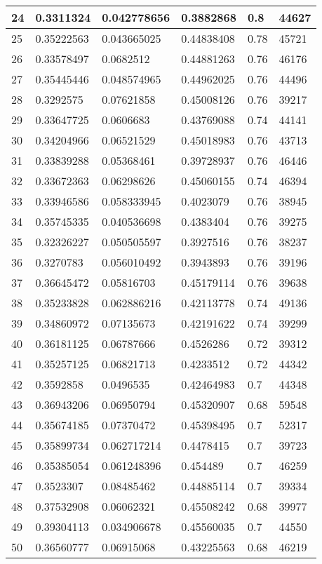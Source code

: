 \begin{longtable}{|l|l|l|l|l|l|}
24 & 0.3311324 & 0.042778656 & 0.3882868 & 0.8 & 44627 \\ \hline 
25 & 0.35222563 & 0.043665025 & 0.44838408 & 0.78 & 45721 \\ \hline 
26 & 0.33578497 & 0.0682512 & 0.44881263 & 0.76 & 46176 \\ \hline 
27 & 0.35445446 & 0.048574965 & 0.44962025 & 0.76 & 44496 \\ \hline 
28 & 0.3292575 & 0.07621858 & 0.45008126 & 0.76 & 39217 \\ \hline 
29 & 0.33647725 & 0.0606683 & 0.43769088 & 0.74 & 44141 \\ \hline 
30 & 0.34204966 & 0.06521529 & 0.45018983 & 0.76 & 43713 \\ \hline 
31 & 0.33839288 & 0.05368461 & 0.39728937 & 0.76 & 46446 \\ \hline 
32 & 0.33672363 & 0.06298626 & 0.45060155 & 0.74 & 46394 \\ \hline 
33 & 0.33946586 & 0.058333945 & 0.4023079 & 0.76 & 38945 \\ \hline 
34 & 0.35745335 & 0.040536698 & 0.4383404 & 0.76 & 39275 \\ \hline 
35 & 0.32326227 & 0.050505597 & 0.3927516 & 0.76 & 38237 \\ \hline 
36 & 0.3270783 & 0.056010492 & 0.3943893 & 0.76 & 39196 \\ \hline 
37 & 0.36645472 & 0.05816703 & 0.45179114 & 0.76 & 39638 \\ \hline 
38 & 0.35233828 & 0.062886216 & 0.42113778 & 0.74 & 49136 \\ \hline 
39 & 0.34860972 & 0.07135673 & 0.42191622 & 0.74 & 39299 \\ \hline 
40 & 0.36181125 & 0.06787666 & 0.4526286 & 0.72 & 39312 \\ \hline 
41 & 0.35257125 & 0.06821713 & 0.4233512 & 0.72 & 44342 \\ \hline 
42 & 0.3592858 & 0.0496535 & 0.42464983 & 0.7 & 44348 \\ \hline 
43 & 0.36943206 & 0.06950794 & 0.45320907 & 0.68 & 59548 \\ \hline 
44 & 0.35674185 & 0.07370472 & 0.45398495 & 0.7 & 52317 \\ \hline 
45 & 0.35899734 & 0.062717214 & 0.4478415 & 0.7 & 39723 \\ \hline 
46 & 0.35385054 & 0.061248396 & 0.454489 & 0.7 & 46259 \\ \hline 
47 & 0.3523307 & 0.08485462 & 0.44885114 & 0.7 & 39334 \\ \hline 
48 & 0.37532908 & 0.06062321 & 0.45508242 & 0.68 & 39977 \\ \hline 
49 & 0.39304113 & 0.034906678 & 0.45560035 & 0.7 & 44550 \\ \hline 
50 & 0.36560777 & 0.06915068 & 0.43225563 & 0.68 & 46219 \\ \hline 
\end{longtable}